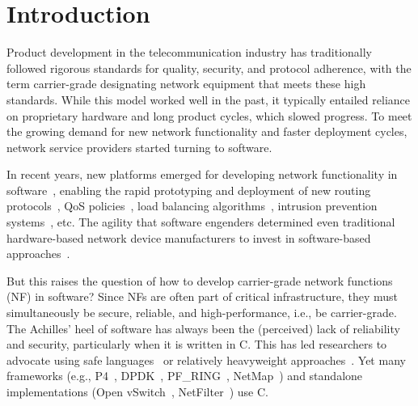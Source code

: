 \documentclass[letterpaper,twocolumn,10pt]{article}
\begin{document}
\section{Introduction}

Product development in the telecommunication industry has traditionally followed rigorous standards for quality, security, and protocol adherence, with the term carrier-grade designating network equipment that meets these high standards. While this model worked well in the past, it typically entailed reliance on proprietary hardware and long product cycles, which slowed progress. To meet the growing demand for new network functionality and faster deployment cycles, network service providers started turning to software.

In recent years, new platforms emerged for developing network functionality in software~\cite{kohler2000click,bosshart2014p4,mccanne1993bsd,song2015unified,shah2003np,shahbaz2016pisces}, enabling the rapid prototyping and deployment of new routing protocols~\cite{sivaraman2016packet}, QoS policies~\cite{sivaraman2016programmable}, load balancing algorithms~\cite{zhang2013steering}, intrusion prevention systems~\cite{xing2014sdnips}, etc. The agility that software engenders determined even traditional hardware-based network device manufacturers to invest in software-based approaches~\cite{ciscodevelopssdn}.

But this raises the question of how to develop carrier-grade network functions (NF) in software? Since NFs are often part of critical infrastructure, they must simultaneously be secure, reliable, and high-performance, i.e., be carrier-grade. The Achilles' heel of software has always been the (perceived) lack of reliability and security, particularly when it is written in C. This has led researchers to advocate using safe languages~\cite{clipsham2015safe, kourtis2015intelligent, fowler2014verified} or relatively heavyweight approaches~\cite{madhavapeddy2007melange, madhavapeddy2005splat, musuvathi2004model, alur2001verifying, ennals2004linear, ridge2008rigorous, qadir2015applying}. Yet many frameworks (e.g., P4~\cite{bosshart2014p4}, DPDK~\cite{intel2014data}, PF\_RING~\cite{pfring}, NetMap~\cite{rizzo2012revisiting}) and standalone implementations (Open vSwitch~\cite{pfaff2009extending}, NetFilter~\cite{boye2013netfilter}) use C. %
\end{document}
